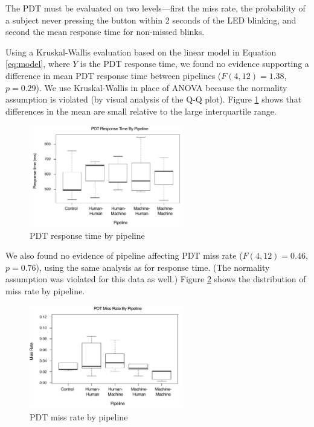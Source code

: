 The PDT must be evaluated on two levels---first the miss rate, the probability of a subject never pressing the button within 2 seconds of the LED blinking, and second the mean response time for non-missed blinks.

Using a Kruskal-Wallis evaluation based on the linear model in Equation \ref{eq:model}, where $Y$ is the PDT response time, we found no evidence supporting a difference in mean PDT response time between pipelines ($F(4, 12) = 1.38$, $p=0.29$). We use Kruskal-Wallis in place of ANOVA because the normality assumption is violated (by visual analysis of the Q-Q plot). Figure \ref{fig:plot:responsetime} shows that differences in the mean are small relative to the large interquartile range.

\begin{figure}[htbp]
  \centering
  \includegraphics[width=0.6\textwidth]{images/plot_responsetime.pdf}
  \caption{PDT response time by pipeline}
  \label{fig:plot:responsetime}
\end{figure}

We also found no evidence of pipeline affecting PDT miss rate ($F(4, 12) = 0.46$, $p=0.76$), using the same analysis as for response time. (The normality assumption was violated for this data as well.) Figure \ref{fig:plot:missrate}  shows the distribution of miss rate by pipeline.

\begin{figure}[htbp]
  \centering
  \includegraphics[width=0.6\textwidth]{images/plot_misses.pdf}
  \caption{PDT miss rate by pipeline}
  \label{fig:plot:missrate}
\end{figure}

